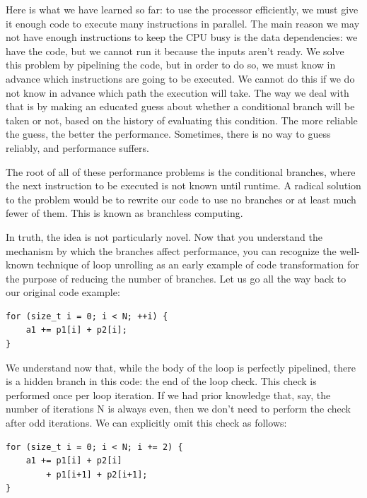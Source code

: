 
Here is what we have learned so far: to use the processor efficiently, we must give it enough code to execute many instructions in parallel. The main reason we may not have enough instructions to keep the CPU busy is the data dependencies: we have the code, but we cannot run it because the inputs aren't ready. We solve this problem by pipelining the code, but in order to do so, we must know in advance which instructions are going to be executed. We cannot do this if we do not know in advance which path the execution will take. The way we deal with that is by making an educated guess about whether a conditional branch will be taken or not, based on the history of evaluating this condition. The more reliable the guess, the better the performance. Sometimes, there is no way to guess reliably, and performance suffers.

The root of all of these performance problems is the conditional branches, where the next instruction to be executed is not known until runtime. A radical solution to the problem would be to rewrite our code to use no branches or at least much fewer of them. This is known as branchless computing.


In truth, the idea is not particularly novel. Now that you understand the mechanism by which the branches affect performance, you can recognize the well-known technique of loop unrolling as an early example of code transformation for the purpose of reducing the number of branches. Let us go all the way back to our original code example:

\begin{lstlisting}[style=styleCXX]
for (size_t i = 0; i < N; ++i) {
	a1 += p1[i] + p2[i];
}
\end{lstlisting}

We understand now that, while the body of the loop is perfectly pipelined, there is a hidden branch in this code: the end of the loop check. This check is performed once per loop iteration. If we had prior knowledge that, say, the number of iterations N is always even, then we don't need to perform the check after odd iterations. We can explicitly omit this check as follows:

\begin{lstlisting}[style=styleCXX]
for (size_t i = 0; i < N; i += 2) {
	a1 += p1[i] + p2[i]
		+ p1[i+1] + p2[i+1];
}
\end{lstlisting}

